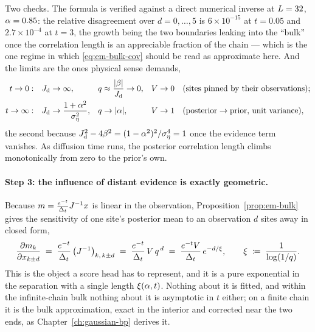 \noindent Two checks. The formula is verified against a direct numerical
inverse at $L = 32$, $\alpha = 0.85$: the relative disagreement over
$d = 0,\dots,5$ is $6\times10^{-15}$ at $t = 0.05$ and $2.7\times10^{-4}$ at
$t = 3$, the growth being the two boundaries leaking into the ``bulk'' once the
correlation length is an appreciable fraction of the chain --- which is the one
regime in which \eqref{eq:em-bulk-cov} should be read as approximate here. And
the limits are the ones physical sense demands,
\begin{equation}
  \begin{aligned}
  t \to 0:&\quad J_{\mathrm{d}} \to \infty,
  &&q \approx \frac{|\beta|}{J_{\mathrm{d}}} \to 0,
  &&V \to 0
  &&\text{(sites pinned by their observations)};\\
  t \to \infty:&\quad J_{\mathrm{d}} \to \frac{1+\alpha^2}{\sigma_\eta^2},
  &&q \to |\alpha|,
  &&V \to 1
  &&\text{(posterior}\to\text{prior, unit variance)},
  \end{aligned}
  \label{eq:em-q-limits}
\end{equation}
the second because $J_{\mathrm{d}}^2 - 4\beta^2 = (1-\alpha^2)^2/\sigma_\eta^4 = 1$
once the evidence term vanishes. As diffusion time runs, the posterior
correlation length climbs monotonically from zero to the prior's own.

\paragraph{Step 3: the influence of distant evidence is exactly geometric.}
Because $m = \frac{e^{-t}}{\Delta_t}J^{-1}x$ is linear in the observation,
Proposition~\ref{prop:em-bulk} gives the sensitivity of one site's posterior
mean to an observation $d$ sites away in closed form,
\begin{equation}
  \frac{\partial m_k}{\partial x_{k \pm d}}
  \;=\; \frac{e^{-t}}{\Delta_t}\,\big(J^{-1}\big)_{k,\,k\pm d}
  \;=\; \frac{e^{-t}}{\Delta_t}\, V\, q^{\,d}
  \;=\; \frac{e^{-t} V}{\Delta_t}\, e^{-d/\xi},
  \qquad
  \xi \;\coloneqq\; \frac{1}{\log(1/q)} .
  \label{eq:em-influence}
\end{equation}
This is the object a score head has to represent, and it is a pure exponential
in the separation with a single length $\xi(\alpha,t)$. Nothing about it is
fitted, and within the infinite-chain bulk nothing about it is asymptotic in
$t$ either; on a finite chain it is the bulk approximation, exact in the
interior and corrected near the two ends, as Chapter~\ref{ch:gaussian-bp}
derives it.

